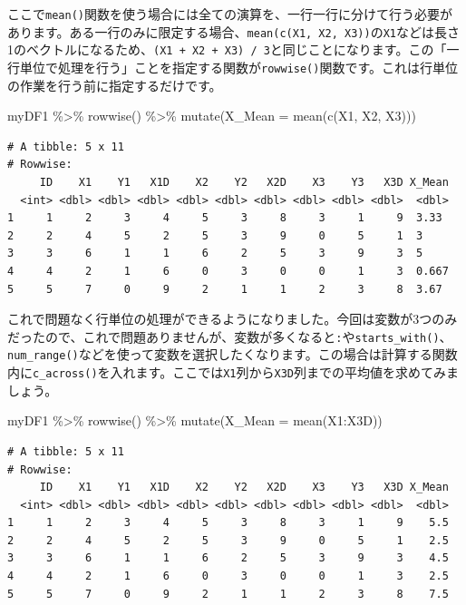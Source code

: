 \documentclass[
  a4paper,
  pandoc,
  ja=standard,
  jafont=haranoaji]{bxjsbook}
\newenvironment{Shaded}{\begin{snugshade}}{\end{snugshade}}
\newcommand{\AttributeTok}[1]{\textcolor[rgb]{0.00,0.48,0.65}{#1}}
\newcommand{\FunctionTok}[1]{\textcolor[rgb]{0.28,0.35,0.67}{#1}}
\newcommand{\NormalTok}[1]{\textcolor[rgb]{0.00,0.48,0.65}{#1}}
\newcommand{\SpecialCharTok}[1]{\textcolor[rgb]{0.37,0.37,0.37}{#1}}
\begin{document}
ここで\texttt{mean()}関数を使う場合には全ての演算を、一行一行に分けて行う必要があります。ある一行のみに限定する場合、\texttt{mean(c(X1,\ X2,\ X3))}の\texttt{X1}などは長さ1のベクトルになるため、\texttt{(X1\ +\ X2\ +\ X3)\ /\ 3}と同じことになります。この「一行単位で処理を行う」ことを指定する関数が\texttt{rowwise()}関数です。これは行単位の作業を行う前に指定するだけです。

\begin{Shaded}
\begin{Highlighting}[numbers=left,,]
\NormalTok{myDF1 }\SpecialCharTok{\%\textgreater{}\%}
  \FunctionTok{rowwise}\NormalTok{() }\SpecialCharTok{\%\textgreater{}\%}
  \FunctionTok{mutate}\NormalTok{(}\AttributeTok{X\_Mean =} \FunctionTok{mean}\NormalTok{(}\FunctionTok{c}\NormalTok{(X1, X2, X3)))}
\end{Highlighting}
\end{Shaded}

\begin{verbatim}
# A tibble: 5 x 11
# Rowwise: 
     ID    X1    Y1   X1D    X2    Y2   X2D    X3    Y3   X3D X_Mean
  <int> <dbl> <dbl> <dbl> <dbl> <dbl> <dbl> <dbl> <dbl> <dbl>  <dbl>
1     1     2     3     4     5     3     8     3     1     9  3.33 
2     2     4     5     2     5     3     9     0     5     1  3    
3     3     6     1     1     6     2     5     3     9     3  5    
4     4     2     1     6     0     3     0     0     1     3  0.667
5     5     7     0     9     2     1     1     2     3     8  3.67 
\end{verbatim}

これで問題なく行単位の処理ができるようになりました。今回は変数が3つのみだったので、これで問題ありませんが、変数が多くなると\texttt{:}や\texttt{starts\_with()}、\texttt{num\_range()}などを使って変数を選択したくなります。この場合は計算する関数内に\texttt{c\_across()}を入れます。ここでは\texttt{X1}列から\texttt{X3D}列までの平均値を求めてみましょう。

\begin{Shaded}
\begin{Highlighting}[numbers=left,,]
\NormalTok{myDF1 }\SpecialCharTok{\%\textgreater{}\%}
  \FunctionTok{rowwise}\NormalTok{() }\SpecialCharTok{\%\textgreater{}\%}
  \FunctionTok{mutate}\NormalTok{(}\AttributeTok{X\_Mean =} \FunctionTok{mean}\NormalTok{(X1}\SpecialCharTok{:}\NormalTok{X3D))}
\end{Highlighting}
\end{Shaded}

\begin{verbatim}
# A tibble: 5 x 11
# Rowwise: 
     ID    X1    Y1   X1D    X2    Y2   X2D    X3    Y3   X3D X_Mean
  <int> <dbl> <dbl> <dbl> <dbl> <dbl> <dbl> <dbl> <dbl> <dbl>  <dbl>
1     1     2     3     4     5     3     8     3     1     9    5.5
2     2     4     5     2     5     3     9     0     5     1    2.5
3     3     6     1     1     6     2     5     3     9     3    4.5
4     4     2     1     6     0     3     0     0     1     3    2.5
5     5     7     0     9     2     1     1     2     3     8    7.5
\end{verbatim}
\end{document}
